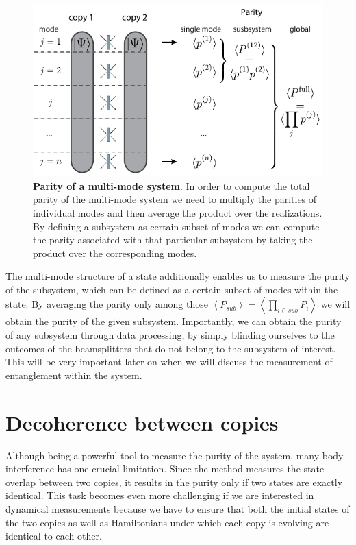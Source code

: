 \begin{figure}[t]
	\centering
	\includegraphics[scale=1]{figures/CBH_multimode.pdf}
	\caption{{\bf Parity of a multi-mode system}. In order to compute the total parity of the multi-mode system we need to multiply the parities of individual modes and then average the product over the realizations. By defining a subsystem as certain subset of modes we can compute the parity associated with that particular subsystem by taking the product over the corresponding modes.}
	\label{fig:CBH_multy_mode}
\end{figure}

The multi-mode structure of a state additionally enables us to measure the purity of the subsystem, which can be defined as a certain subset of modes within the state. By averaging the parity only among those $\left<P_{sub}\right> = \left< \prod_{i \in sub} P_i \right>$ we will obtain the purity of the given subsystem.  Importantly, we can obtain the purity of any subsystem through data processing, by simply blinding ourselves to the outcomes of the beamsplitters that do not belong to the subsystem of interest. This will be very important later on when we will discuss the measurement of entanglement within the system.

\section{Decoherence between copies}
Although being a powerful tool to measure the purity of the system, many-body interference has one crucial limitation. Since the method measures the state overlap between two copies, it results in the purity only if two states are exactly identical. This task becomes even more challenging if we are interested in dynamical measurements because we have to ensure that both the initial states of the two copies as well as Hamiltonians under which each copy is evolving are identical to each other.

